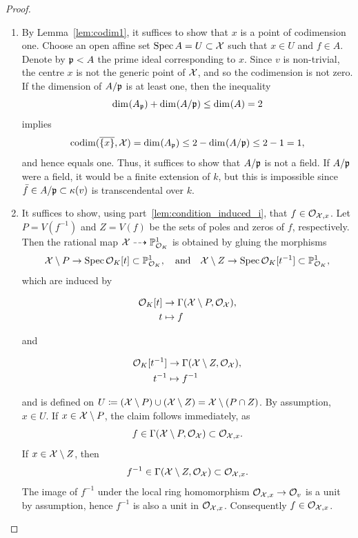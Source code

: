 \begin{proof}
    \begin{enumerate}[label=\textup{(\roman*)}]
    \item By Lemma~\ref{lem:codim1}, it suffices to show that $x$ is a point of codimension one.
    Choose an open affine set $\operatorname{Spec} A = U \subset \mathcal X$ such that $x \in U$ and $f \in A$.
    Denote by $\mathfrak p < A$ the prime ideal corresponding to $x$.
    Since $v$ is non-trivial, the centre $x$ is not the generic point of $\mathcal X$, and so the codimension is not zero.
    If the dimension of $A/\mathfrak p$ is at least one, then the inequality
    \[
        \operatorname{dim_{}}(A_\mathfrak p) + \operatorname{dim_{}}(A/\mathfrak p) \leq \operatorname{dim_{}}(A) = 2
    \]
    implies
    \[
        \operatorname{codim}(\overline{\{x\}}, \mathcal X) = \operatorname{dim_{}}(A_\mathfrak p) \leq 2 - \operatorname{dim_{}}(A/\mathfrak p) \leq 2 - 1 = 1,
    \]
    and hence equals one.
    Thus, it suffices to show that $A/\mathfrak p$ is not a field.
    If $A/\mathfrak p$ were a field, it would be a finite extension
    of $k$, but this is impossible since $\bar{f} \in A/\mathfrak p \subset \kappa(v)$ is transcendental over $k$.
    \item It suffices to show, using part~\ref{lem:condition_induced_i}, that $f \in \mathcal{O}_{\mathcal X, x}$.
    Let $P = V(f^{-1})$ and $Z = V(f)$ be the sets of poles and zeros of $f$, respectively.
    Then the rational map $\mathcal X \dashrightarrow \mathbb P^1_{\mathcal O_K}$ is obtained by gluing the morphisms
    \[
        \mathcal X \setminus P  \to \operatorname{Spec} \mathcal O_K [t] \subset \mathbb P^1_{\mathcal O_K}, \quad \textrm{and} \quad
        \mathcal X \setminus Z \to \operatorname{Spec} \mathcal O_K [t^{-1}] \subset \mathbb P^1_{\mathcal O_K},
    \]
    which are induced by
    \begin{center}
        \begin{minipage}{0.25\textwidth}
            \begin{align*}
                \mathcal O_K [t] &\to \Gamma(\mathcal X \setminus P, \mathcal{O}_{\mathcal X}), \\
                t &\mapsto f
            \end{align*}
        \end{minipage}
        \quad and \quad
        \begin{minipage}{0.25\textwidth}
            \begin{align*}
                \mathcal O_K [t^{-1}] &\to \Gamma(\mathcal X \setminus Z, \mathcal{O}_{\mathcal X}), \\
                t^{-1} &\mapsto f^{-1}
            \end{align*}
        \end{minipage}
    \end{center}
    and is defined on $U \coloneqq (\mathcal X \setminus P) \cup (\mathcal X \setminus Z) = \mathcal X \setminus (P \cap Z)$.
    By assumption, $x \in U$. If $x \in \mathcal X \setminus P$, the claim follows immediately, as
    \[
        f \in \Gamma(\mathcal X \setminus P, \mathcal{O}_{\mathcal X}) \subset \mathcal{O}_{\mathcal X, x}.
    \]
    If $x \in \mathcal X \setminus Z$, then
    \[
        f^{-1} \in \Gamma(\mathcal X \setminus Z, \mathcal{O}_{\mathcal X}) \subset \mathcal{O}_{\mathcal X, x}.
    \]
    The image of $f^{-1}$ under the local ring homomorphism $\mathcal{O}_{\mathcal X, x} \to \mathcal{O}_v$ is a unit by assumption,
    hence $f^{-1}$ is also a unit in $\mathcal{O}_{\mathcal X, x}$.
    Consequently $f \in \mathcal{O}_{\mathcal X, x}$.
    \end{enumerate}
\end{proof}

